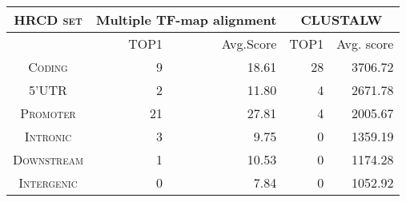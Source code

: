 \documentclass{article}
\begin{document}
\begin{center}

\noindent\begin{minipage}{\linewidth}%
\begin{center}%


\begin{tabular}{|>{\scshape}c|rr|rr|}
\hline
\rowcolor[gray]{0.9}
\color{black} \bfseries \scshape \textsc{HRCD set} 
& \multicolumn{2}{|c|}{Multiple TF-map alignment} 
& \multicolumn{2}{|c|}{CLUSTALW}\\
\hline
& TOP1 & Avg.Score & TOP1 & Avg. score\\
\hline
Coding & 9 & 18.61 & 28 & 3706.72\\
5'UTR & 2 & 11.80 & 4 & 2671.78\\
Promoter & 21 & 27.81 & 4 & 2005.67\\
Intronic & 3 & 9.75 & 0 & 1359.19\\
Downstream & 1 & 10.53 & 0 & 1174.28\\
Intergenic & 0 & 7.84 & 0 & 1052.92\\
\hline
\end{tabular}
\end{center}%
\end{minipage}%

\end{center}%
\end{document}
